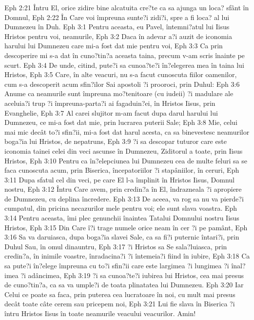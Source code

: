 Eph 2:21  Întru El, orice zidire bine alcatuita cre?te ca sa ajunga un loca? sfânt în Domnul,
Eph 2:22  În Care voi împreuna sunte?i zidi?i, spre a fi loca? al lui Dumnezeu în Duh.
Eph 3:1  Pentru aceasta, eu Pavel, întemni?atul lui Iisus Hristos pentru voi, neamurile,
Eph 3:2  Daca în adevar a?i auzit de iconomia harului lui Dumnezeu care mi-a fost dat mie pentru voi,
Eph 3:3  Ca prin descoperire mi s-a dat în cuno?tin?a aceasta taina, precum v-am scris înainte pe scurt.
Eph 3:4  De unde, citind, pute?i sa cunoa?te?i în?elegerea mea în taina lui Hristos,
Eph 3:5  Care, în alte veacuri, nu s-a facut cunoscuta fiilor oamenilor, cum s-a descoperit acum sfin?ilor Sai apostoli ?i prooroci, prin Duhul:
Eph 3:6  Anume ca neamurile sunt împreuna mo?tenitoare (cu iudeii) ?i madulare ale aceluia?i trup ?i împreuna-parta?i ai fagaduin?ei, în Hristos Iisus, prin Evanghelie,
Eph 3:7  Al carei slujitor m-am facut dupa darul harului lui Dumnezeu, ce mi-a fost dat mie, prin lucrarea puterii Sale;
Eph 3:8  Mie, celui mai mic decât to?i sfin?ii, mi-a fost dat harul acesta, ca sa binevestesc neamurilor boga?ia lui Hristos, de nepatruns,
Eph 3:9  ?i sa descopar tuturor care este iconomia tainei celei din veci ascunse în Dumnezeu, Ziditorul a toate, prin Iisus Hristos,
Eph 3:10  Pentru ca în?elepciunea lui Dumnezeu cea de multe feluri sa se faca cunoscuta acum, prin Biserica, începatoriilor ?i stapâniilor, în ceruri,
Eph 3:11  Dupa sfatul cel din veci, pe care El l-a împlinit în Hristos Iisus, Domnul nostru,
Eph 3:12  Întru Care avem, prin credin?a în El, îndrazneala ?i apropiere de Dumnezeu, cu deplina încredere.
Eph 3:13  De aceea, va rog sa nu va pierde?i cumpatul, din pricina necazurilor mele pentru voi; ele sunt slava voastra.
Eph 3:14  Pentru aceasta, îmi plec genunchii înaintea Tatalui Domnului nostru Iisus Hristos,
Eph 3:15  Din Care î?i trage numele orice neam în cer ?i pe pamânt,
Eph 3:16  Sa va daruiasca, dupa boga?ia slavei Sale, ca sa fi?i puternic întari?i, prin Duhul Sau, în omul dinauntru,
Eph 3:17  ?i Hristos sa Se sala?luiasca, prin credin?a, în inimile voastre, înradacina?i ?i întemeia?i fiind în iubire,
Eph 3:18  Ca sa pute?i în?elege împreuna cu to?i sfin?ii care este largimea ?i lungimea ?i înal?imea ?i adâncimea,
Eph 3:19  ?i sa cunoa?te?i iubirea lui Hristos, cea mai presus de cuno?tin?a, ca sa va umple?i de toata plinatatea lui Dumnezeu.
Eph 3:20  Iar Celui ce poate sa faca, prin puterea cea lucratoare în noi, cu mult mai presus decât toate câte cerem sau pricepem noi,
Eph 3:21  Lui fie slava în Biserica ?i întru Hristos Iisus în toate neamurile veacului veacurilor. Amin!
